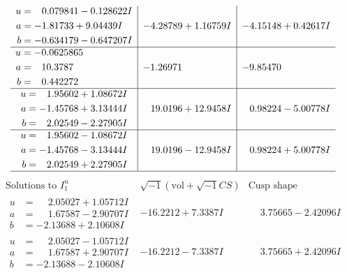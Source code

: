 \documentclass[1p]{elsarticle_modified}
\theoremstyle{definition}
\newcommand{\I}{\sqrt{-1}}
\begin{document}
$$\begin{array}{c|c|c}
\begin{aligned}
u &= \phantom{-}0.079841 - 0.128622 I \\
a &= -1.81733 + 9.04439 I \\
b &= -0.634179 - 0.647207 I\end{aligned}
 & -4.28789 + 1.16759 I & -4.15148 + 0.42617 I \\ \hline\begin{aligned}
u &= -0.0625865\phantom{ +0.000000I} \\
a &= \phantom{-}10.3787\phantom{ +0.000000I} \\
b &= \phantom{-}0.442272\phantom{ +0.000000I}\end{aligned}
 & -1.26971\phantom{ +0.000000I} & -9.85470\phantom{ +0.000000I} \\ \hline\begin{aligned}
u &= \phantom{-}1.95602 + 1.08672 I \\
a &= -1.45768 + 3.13444 I \\
b &= \phantom{-}2.02549 - 2.27905 I\end{aligned}
 & \phantom{-}19.0196 + 12.9458 I & \phantom{-}0.98224 - 5.00778 I \\ \hline\begin{aligned}
u &= \phantom{-}1.95602 - 1.08672 I \\
a &= -1.45768 - 3.13444 I \\
b &= \phantom{-}2.02549 + 2.27905 I\end{aligned}
 & \phantom{-}19.0196 - 12.9458 I & \phantom{-}0.98224 + 5.00778 I\\
 \hline 
 \end{array}$$\newpage$$\begin{array}{c|c|c}  
\text{Solutions to }I^u_{1}& \I (\text{vol} + \sqrt{-1}CS) & \text{Cusp shape}\\
 \hline 
\begin{aligned}
u &= \phantom{-}2.05027 + 1.05712 I \\
a &= \phantom{-}1.67587 - 2.90707 I \\
b &= -2.13688 + 2.10608 I\end{aligned}
 & -16.2212 + 7.3387 I & \phantom{-}3.75665 - 2.42096 I \\ \hline\begin{aligned}
u &= \phantom{-}2.05027 - 1.05712 I \\
a &= \phantom{-}1.67587 + 2.90707 I \\
b &= -2.13688 - 2.10608 I\end{aligned}
 & -16.2212 - 7.3387 I & \phantom{-}3.75665 + 2.42096 I \\ \hline\begin{aligned}

\end{aligned}
\end{array}$$
\end{document}
